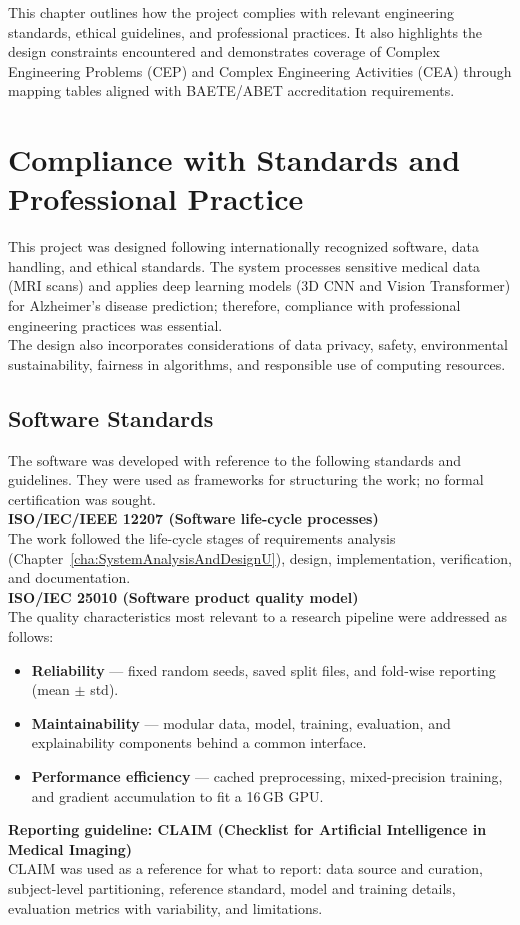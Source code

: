 
This chapter outlines how the project complies with relevant engineering standards, ethical guidelines, and professional practices. It also highlights the design constraints encountered and demonstrates coverage of Complex Engineering Problems (CEP) and Complex Engineering Activities (CEA) through mapping tables aligned with BAETE/ABET accreditation requirements.
\section{Compliance with Standards and Professional Practice}
This project was designed following internationally recognized software, data handling, and ethical standards. The system processes sensitive medical data (MRI scans) and applies deep learning models (3D CNN and Vision Transformer) for Alzheimer’s disease prediction; therefore, compliance with professional engineering practices was essential.\\
The design also incorporates considerations of data privacy, safety, environmental sustainability, fairness in algorithms, and responsible use of computing resources.
\subsection{Software Standards}
The software was developed with reference to the following standards and guidelines. They were used as frameworks for structuring the work; no formal certification was sought.\\
\textbf{ISO/IEC/IEEE 12207 (Software life-cycle processes)}\\
The work followed the life-cycle stages of requirements analysis (Chapter~\ref{cha:SystemAnalysisAndDesignU}), design, implementation, verification, and documentation.\\
\textbf{ISO/IEC 25010 (Software product quality model)}\\
The quality characteristics most relevant to a research pipeline were addressed as follows:
\begin{itemize}
    \item \textbf{Reliability} --- fixed random seeds, saved split files, and fold-wise reporting (mean $\pm$ std).
    \item \textbf{Maintainability} --- modular data, model, training, evaluation, and explainability components behind a common interface.
    \item \textbf{Performance efficiency} --- cached preprocessing, mixed-precision training, and gradient accumulation to fit a 16\,GB GPU.
\end{itemize}
\textbf{Reporting guideline: CLAIM (Checklist for Artificial Intelligence in Medical Imaging)}\\
CLAIM was used as a reference for what to report: data source and curation, subject-level partitioning, reference standard, model and training details, evaluation metrics with variability, and limitations.

